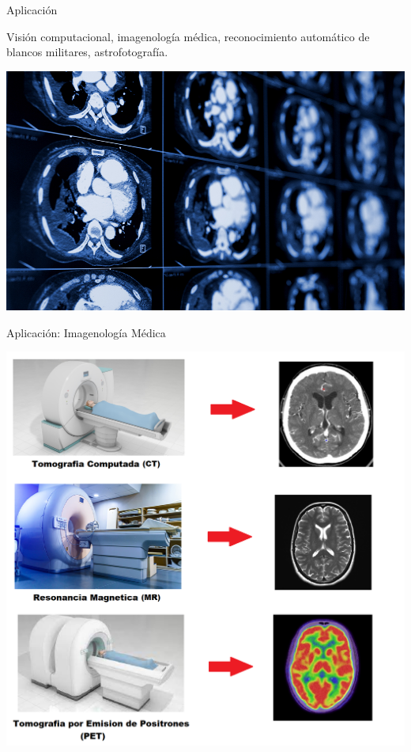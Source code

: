 \documentclass[14pt,xcolor={rgb}]{beamer}
\begin{document}
\begin{frame}{Aplicaci\'on}

Visi\'on computacional, imagenolog\'ia m\'edica, reconocimiento autom\'atico de blancos militares, astrofotograf\'ia.

\begin{center}
	\includegraphics[scale=0.2]{Images/medical_imaging.jpg}
\end{center}
\end{frame}

\begin{frame}{Aplicaci\'on: Imagenolog\'ia M\'edica}
\begin{center}
	\includegraphics[scale=0.18]{Images/multimodality.png}
\end{center}
\end{frame}
\end{document}
